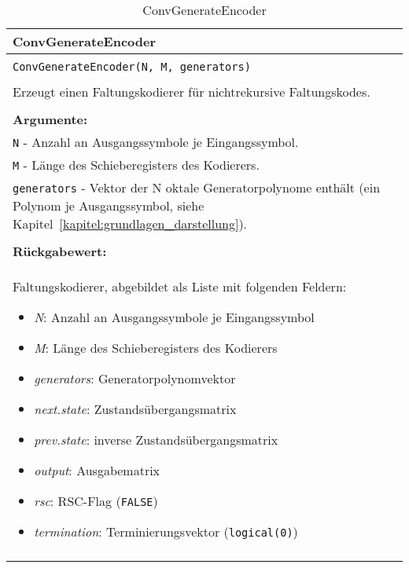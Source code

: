 \begin{longtable}{|p{\textwidth}|}
\hline
\rowcolor{lightblue}
ConvGenerateEncoder
\\
\hline
\\
\texttt{ConvGenerateEncoder(N, M, generators)}\\
\\
Erzeugt einen Faltungskodierer für nichtrekursive Faltungskodes.\\
\\
\textbf{Argumente:}\\
\texttt{N} - Anzahl an Ausgangssymbole je Eingangssymbol.\\
\texttt{M} - Länge des Schieberegisters des Kodierers.\\
\texttt{generators} - Vektor der N oktale Generatorpolynome enthält (ein Polynom je Ausgangssymbol, siehe Kapitel~\ref{kapitel:grundlagen_darstellung}).\\
\\
\textbf{Rückgabewert:}\\
Faltungskodierer, abgebildet als Liste mit folgenden Feldern:
\vspace{-4mm}
\begin{itemize}
\renewcommand\labelitemi{--}
\itemsep-.5em %
\item \emph{N}: Anzahl an Ausgangssymbole je Eingangssymbol
\item \emph{M}: Länge des Schieberegisters des Kodierers
\item \emph{generators}: Generatorpolynomvektor
\item \emph{next.state}: Zustandsübergangsmatrix
\item \emph{prev.state}: inverse Zustandsübergangsmatrix
\item \emph{output}: Ausgabematrix
\item \emph{rsc}: RSC-Flag (\texttt{FALSE})
\item \emph{termination}: Terminierungsvektor (\texttt{logical(0)})
\end{itemize}
\\
\hline
\caption{ConvGenerateEncoder}
\label{funktion:ConvGenerateEncoder}
\end{longtable}